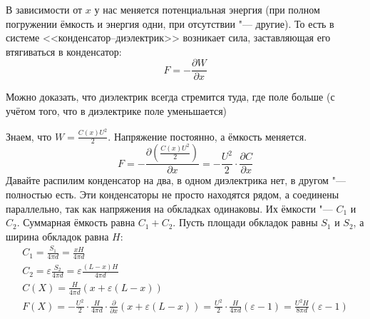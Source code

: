     В зависимости от $x$ у нас меняется потенциальная энергия (при полном погружении ёмкость и энергия одни,
    при отсутствии "--- другие).
    То есть в системе <<конденсатор--диэлектрик>> возникает сила, заставляющая его втягиваться в конденсатор:
    \[ F = - \frac{\partial W}{\partial x} \]
    \begin{Rem}
      Можно доказать, что диэлектрик всегда стремится туда, где поле больше
      (с учётом того, что в диэлектрике поле уменьшается)
    \end{Rem}

    Знаем, что $W = \frac{C(x)U^2}{2}$.
    Напряжение постоянно, а ёмкость меняется.
    \[F = -\frac{\partial\left(\frac{C(x)U^2}{2}\right)}{\partial x} = -\frac{U^2}{2} \cdot \frac{\partial C}{\partial x}\]
    Давайте распилим конденсатор на два, в одном диэлектрика нет, в другом "--- полностью есть.
    Эти конденсаторы не просто находятся рядом, а соединены параллельно, так как напряжения на обкладках одинаковы.
    Их ёмкости "--- $C_1$ и $C_2$.
    Суммарная ёмкость равна $C_1+C_2$.
    Пусть площади обкладок равны $S_1$ и $S_2$, а ширина обкладок равна $H$:
    \begin{gather*}
    C_1=\frac{S_1}{4\pi d} = \frac{xH}{4\pi d} \\
    C_2=\varepsilon\frac{S_2}{4\pi d} = \varepsilon\frac{(L-x)H}{4\pi d} \\
    C(X) = \frac{H}{4\pi d}(x+\varepsilon(L-x)) \\
    F(X) = -\frac{U^2}{2} \cdot \frac{H}{4\pi d} \cdot \frac{\partial}{\partial x}(x + \varepsilon(L-x))
         = \frac{U^2}{2} \cdot \frac{H}{4\pi d}(\varepsilon-1)
         = \frac{U^2H}{8\pi d} (\varepsilon-1)
    \end{gather*}
